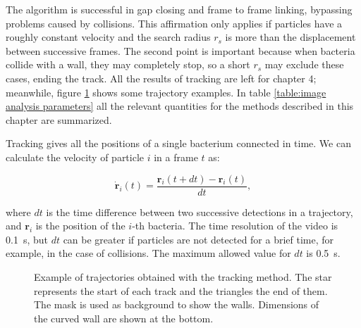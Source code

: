 The algorithm is successful in gap closing and frame to frame linking, bypassing problems caused by collisions. This affirmation only applies if particles have a roughly constant velocity and the search radius $r_s$ is more than the displacement between successive frames. The second point is important because when bacteria collide with a wall, they may completely stop, so a short $r_s$ may exclude these cases, ending the track. All the results of tracking are left for chapter 4; meanwhile, figure \ref{tracking_examples} shows some trajectory examples. In table \ref{table:image analysis parameters} all the relevant quantities for the methods described in this chapter are summarized.

Tracking gives all the positions of a single bacterium connected in time. We can calculate the velocity of particle $i$ in a frame $t$ as:

\begin{equation} \label{eq tracking velocity}
    \dot{\textbf{r}}_i(t) =  \frac{\textbf{r}_i(t+dt)-\textbf{r}_i(t)}{dt},
\end{equation}

where $dt$ is the time difference between two successive detections in a trajectory, and $\textbf{r}_i$ is the position of the $i$-th bacteria. The time resolution of the video is \SI{0.1}{\second}, but $dt$ can be greater if particles are not detected for a brief time, for example, in the case of collisions. The maximum allowed value for $dt$ is \SI{0.5}{\second}. 

\begin{figure}
	\centering
	
	\caption[Example of trajectories]{Example of trajectories obtained with the tracking method. The star represents the start of each track and the triangles the end of them. The mask is used as background to show the walls. Dimensions of the curved wall are shown at the bottom.}
	\label{tracking_examples}
\end{figure}


